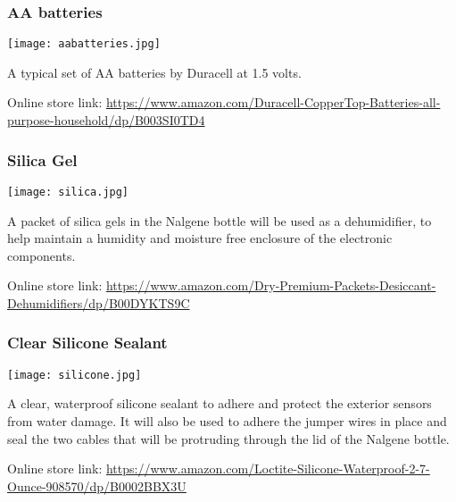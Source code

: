 \hypertarget{battery}{}
\subsubsection{AA batteries}

\hspace{2em}
\texttt{[image: aabatteries.jpg]}

\begin{flushleft}
    A typical set of AA batteries by Duracell at 1.5 volts.
    \newline

    Online store link: \newline
    \footnotesize\url{https://www.amazon.com/Duracell-CopperTop-Batteries-all-purpose-household/dp/B003SI0TD4}

\end{flushleft}

\hypertarget{silica}{}
\subsubsection{Silica Gel}

\hspace{2em}
\texttt{[image: silica.jpg]}

\begin{flushleft}
    A packet of silica gels in the Nalgene bottle will be used as a dehumidifier, 
    to help maintain a humidity and moisture free enclosure of the electronic 
    components.
    \newline

    Online store link: \newline
    \footnotesize\url{https://www.amazon.com/Dry-Premium-Packets-Desiccant-Dehumidifiers/dp/B00DYKTS9C}

\end{flushleft}

\hypertarget{glue}{}
\subsubsection{Clear Silicone Sealant}

\hspace{2em}
\texttt{[image: silicone.jpg]}

\begin{flushleft}
    A clear, waterproof silicone sealant to adhere and protect the exterior 
    sensors from water damage. It will also be used to adhere the jumper wires 
    in place and seal the two cables that will be protruding through the lid 
    of the Nalgene bottle.
    \newline

    Online store link: \newline
    \footnotesize\url{https://www.amazon.com/Loctite-Silicone-Waterproof-2-7-Ounce-908570/dp/B0002BBX3U}

\end{flushleft}


